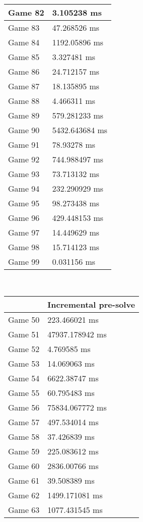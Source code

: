 \begin{multicols}{2}
\begin{tabular}{|l|l|}
	Game 82 & 3.105238 ms \\ \hline
	Game 83 & 47.268526 ms \\ \hline
	Game 84 & 1192.05896 ms \\ \hline
	Game 85 & 3.327481 ms \\ \hline
	Game 86 & 24.712157 ms \\ \hline
	Game 87 & 18.135895 ms \\ \hline
	Game 88 & 4.466311 ms \\ \hline
	Game 89 & 579.281233 ms \\ \hline
	Game 90 & 5432.643684 ms \\ \hline
	Game 91 & 78.93278 ms \\ \hline
	Game 92 & 744.988497 ms \\ \hline
	Game 93 & 73.713132 ms \\ \hline
	Game 94 & 232.290929 ms \\ \hline
	Game 95 & 98.273438 ms \\ \hline
	Game 96 & 429.448153 ms \\ \hline
	Game 97 & 14.449629 ms \\ \hline
	Game 98 & 15.714123 ms \\ \hline
	Game 99 & 0.031156 ms \\ \hline
\end{tabular}\\
\begin{tabular}{|l|l|}
	\hline
	& Incremental pre-solve \\ \hline
	Game 50 & 223.466021 ms \\ \hline
	Game 51 & 47937.178942 ms \\ \hline
	Game 52 & 4.769585 ms \\ \hline
	Game 53 & 14.069063 ms \\ \hline
	Game 54 & 6622.38747 ms \\ \hline
	Game 55 & 60.795483 ms \\ \hline
	Game 56 & 75834.067772 ms \\ \hline
	Game 57 & 497.534014 ms \\ \hline
	Game 58 & 37.426839 ms \\ \hline
	Game 59 & 225.083612 ms \\ \hline
	Game 60 & 2836.00766 ms \\ \hline
	Game 61 & 39.508389 ms \\ \hline
	Game 62 & 1499.171081 ms \\ \hline
	Game 63 & 1077.431545 ms \\ \hline

\end{tabular}
\end{multicols}
